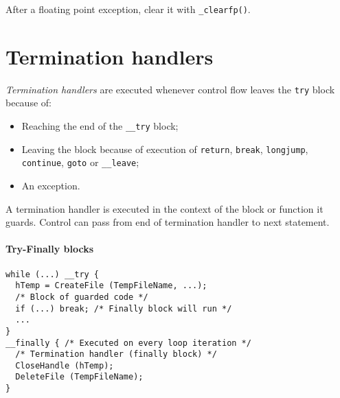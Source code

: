 After a floating point exception, clear it with \texttt{\_clearfp()}.

\section{Termination handlers}
\emph{Termination handlers} are executed whenever control flow leaves the \texttt{try} block because of:
\begin{itemize}
\item Reaching the end of the \texttt{\_\_try} block;
\item Leaving the block because of execution of \texttt{return}, \texttt{break}, \texttt{longjump}, \texttt{continue}, \texttt{goto} or \texttt{\_\_leave};
\item An exception.
\end{itemize}
A termination handler is executed in the context of the block or function it guards. Control can pass from end of termination handler to next statement.

\paragraph{Try-Finally blocks}
\begin{verbatim}
while (...) __try {
  hTemp = CreateFile (TempFileName, ...);
  /* Block of guarded code */
  if (...) break; /* Finally block will run */
  ...
}
__finally { /* Executed on every loop iteration */
  /* Termination handler (finally block) */
  CloseHandle (hTemp);
  DeleteFile (TempFileName);
}
\end{verbatim}